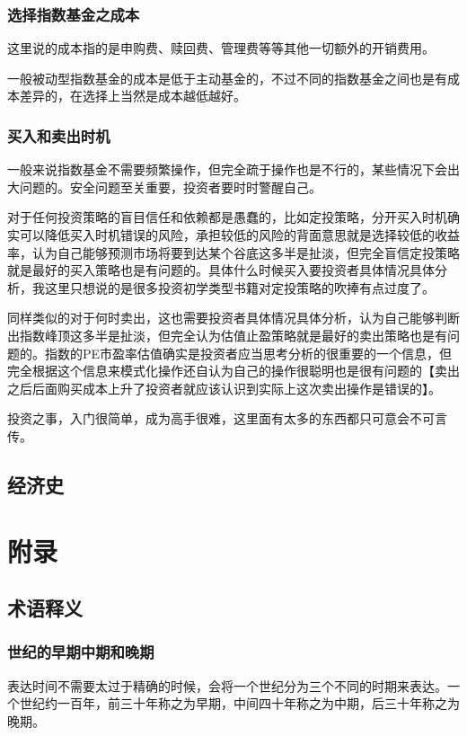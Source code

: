 \documentclass[12pt,oneside]{book}
\begin{document}
\section{选择指数基金之成本}
这里说的成本指的是申购费、赎回费、管理费等等其他一切额外的开销费用。

一般被动型指数基金的成本是低于主动基金的，不过不同的指数基金之间也是有成本差异的，在选择上当然是成本越低越好。




\section{买入和卖出时机}
一般来说指数基金不需要频繁操作，但完全疏于操作也是不行的，某些情况下会出大问题的。安全问题至关重要，投资者要时时警醒自己。

对于任何投资策略的盲目信任和依赖都是愚蠢的，比如定投策略，分开买入时机确实可以降低买入时机错误的风险，承担较低的风险的背面意思就是选择较低的收益率，认为自己能够预测市场将要到达某个谷底这多半是扯淡，但完全盲信定投策略就是最好的买入策略也是有问题的。具体什么时候买入要投资者具体情况具体分析，我这里只想说的是很多投资初学类型书籍对定投策略的吹捧有点过度了。

同样类似的对于何时卖出，这也需要投资者具体情况具体分析，认为自己能够判断出指数峰顶这多半是扯淡，但完全认为估值止盈策略就是最好的卖出策略也是有问题的。指数的PE市盈率估值确实是投资者应当思考分析的很重要的一个信息，但完全根据这个信息来模式化操作还自认为自己的操作很聪明也是很有问题的【卖出之后后面购买成本上升了投资者就应该认识到实际上这次卖出操作是错误的】。

投资之事，入门很简单，成为高手很难，这里面有太多的东西都只可意会不可言传。



\chapter{经济史}





\appendix
\part{附录}




\chapter{术语释义}
\section{世纪的早期中期和晚期}
表达时间不需要太过于精确的时候，会将一个世纪分为三个不同的时期来表达。一个世纪约一百年，前三十年称之为早期，中间四十年称之为中期，后三十年称之为晚期。
\end{document}
